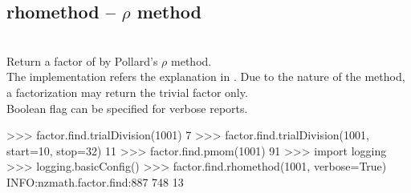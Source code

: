    \subsection{rhomethod -- $\rho$ method}
   \\
   \spacing
   \quad Return a factor of  by Pollard's \(\rho\) method.\\
   \spacing
   The implementation refers the explanation in \cite{Pomerance}.
   Due to the nature of the method, a factorization may return the
   trivial factor only.\\
   \spacing
   \quad {} Boolean flag can be specified for verbose reports.\\
\begin{ex}
>>> factor.find.trialDivision(1001)
7
>>> factor.find.trialDivision(1001, start=10, stop=32)
11
>>> factor.find.pmom(1001)
91
>>> import logging
>>> logging.basicConfig()
>>> factor.find.rhomethod(1001, verbose=True)
INFO:nzmath.factor.find:887 748
13
\end{ex}%
\C



